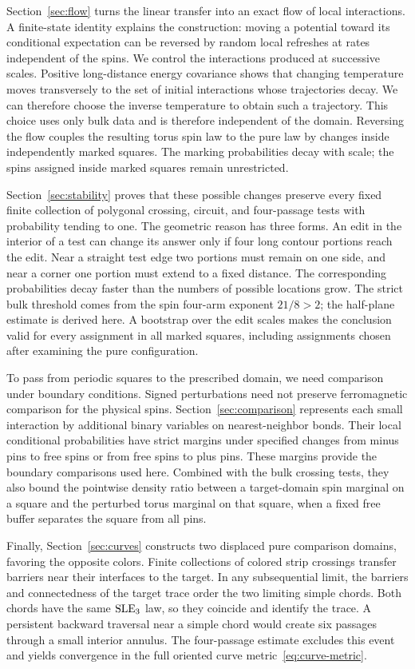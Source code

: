 Section~\ref{sec:flow} turns the linear transfer into an exact flow of
local interactions. A finite-state identity explains the construction:
moving a potential toward its conditional expectation can be reversed
by random local refreshes at rates independent of the spins. We control
the interactions produced at successive scales. Positive long-distance
energy covariance shows that changing temperature moves transversely
to the set of initial interactions whose trajectories decay. We can
therefore choose the inverse temperature to obtain such a trajectory.
This choice uses only bulk data and is
therefore independent of the domain. Reversing the flow couples the
resulting torus spin law to the pure law by changes inside independently
marked squares. The marking probabilities decay with scale; the spins
assigned inside marked squares remain unrestricted.

Section~\ref{sec:stability} proves that these possible changes preserve
every fixed finite collection of polygonal crossing, circuit, and
four-passage tests with probability tending to one. The geometric reason
has three forms. An edit in the interior of a test can change its answer
only if four long contour portions reach the edit. Near a straight test
edge two portions must remain on one side, and near a corner one portion
must extend to a fixed distance. The corresponding probabilities decay
faster than the numbers of possible locations grow. The strict bulk
threshold comes from the spin four-arm exponent \(21/8>2\); the
half-plane estimate is derived here. A bootstrap over the edit scales
makes the conclusion valid for every assignment in all marked squares,
including assignments chosen after examining the pure configuration.

To pass from periodic squares to the prescribed domain, we need comparison
under boundary conditions. Signed perturbations need not preserve
ferromagnetic comparison for the physical spins. Section~\ref{sec:comparison}
represents each small interaction by additional binary variables on
nearest-neighbor bonds. Their local conditional probabilities have strict
margins under specified changes from minus pins to free spins or from free
spins to plus pins. These margins provide the boundary comparisons used
here. Combined with the bulk crossing tests, they also bound the
pointwise density ratio between a target-domain spin marginal on a
square and the perturbed torus marginal on that square, when a fixed
free buffer separates the square from all pins.

Finally, Section~\ref{sec:curves} constructs two displaced pure comparison
domains, favoring the opposite colors. Finite collections of colored strip
crossings transfer barriers near their interfaces to the target. In any
subsequential limit, the barriers and connectedness of the target trace
order the two limiting simple chords. Both chords have the same
\(\operatorname{SLE}_3\) law, so they coincide and identify the trace. A persistent backward traversal near a
simple chord would create six passages through a small interior annulus.
The four-passage estimate excludes this event and yields convergence in
the full oriented curve metric~\eqref{eq:curve-metric}.

